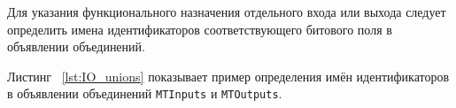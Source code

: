 Для указания функционального назначения отдельного входа или выхода следует определить имена идентификаторов соответствующего битового поля в объявлении объединений.

Листинг ~\ref{lst:IO_unions} показывает пример определения имён идентификаторов в объявлении объединений \texttt{MTInputs} и \texttt{MTOutputs}. \killoverfullbefore \BL


\begin{comment}
\begin{pExample}
\IncludeLstWithoutBorder{./listings/NullSample.pas}{~}{lst:IO-ex-1}
              
\begin{tabular}{l l}


\end{comment}

